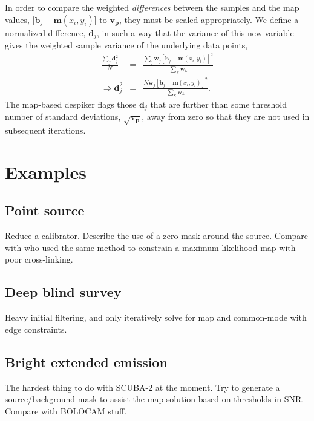 \documentclass[useAMS,usenatbib,nofootinbib]{mn2e}
\newcommand{\snr}{SNR}
\begin{document}
In order to compare the weighted \emph{differences} between the
samples and the map values, [$\mathbf{b}_j - \mathbf{m}(x_i,y_i)$] to
$\mathbf{v_p}$, they must be scaled appropriately. We define a
normalized difference, $\mathbf{d}_j$, in such a way that the variance
of this new variable gives the weighted sample variance of the
underlying data points,
%
\begin{eqnarray}
  \frac{\sum_j \mathbf{d}_j^2}{N} &=&
  \frac{\sum_j \mathbf{w}_j [\mathbf{b}_j - \mathbf{m}(x_i,y_i)]^2}
       {\sum_k \mathbf{w}_k} \\
   \Rightarrow \mathbf{d}_j^2 &=& \frac{N \mathbf{w}_j [\mathbf{b}_j -
       \mathbf{m}(x_i,y_i)]^2}{ \sum_k \mathbf{w}_k} .
\end{eqnarray}
%
The map-based despiker flags those $\mathbf{d}_j$ that are further
than some threshold number of standard deviations,
$\sqrt{\mathbf{v_p}}$, away from zero so that they are not used in
subsequent iterations.


\section{Examples}
\label{sec:examples}

\subsection{Point source}
Reduce a calibrator. Describe the use of a zero mask around the
source. Compare with \citet{wiebe2009} who used the same method to
constrain a maximum-likelihood map with poor cross-linking.

\subsection{Deep blind survey}
Heavy initial filtering, and only iteratively solve for map and
common-mode with edge constraints.


\subsection{Bright extended emission}
The hardest thing to do with SCUBA-2 at the moment. Try to generate a
source/background mask to assist the map solution based on thresholds
in \snr. Compare with BOLOCAM stuff.

\end{document}
